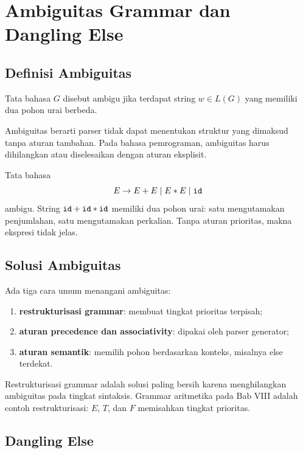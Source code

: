 \section{Ambiguitas Grammar dan Dangling Else}
\label{sec:ch09-ambiguitas}

\subsection{Definisi Ambiguitas}

\begin{definisi}
Tata bahasa \(G\) disebut ambigu jika terdapat string
\(w \in L(G)\) yang memiliki dua pohon urai berbeda.
\end{definisi}

Ambiguitas berarti parser tidak dapat menentukan struktur yang
dimaksud tanpa aturan tambahan. Pada bahasa pemrograman, ambiguitas
harus dihilangkan atau diselesaikan dengan aturan eksplisit.

\begin{contoh}
Tata bahasa
\[
E \to E + E \mid E * E \mid \texttt{id}
\]
ambigu. String \(\texttt{id} + \texttt{id} * \texttt{id}\) memiliki dua
pohon urai: satu mengutamakan penjumlahan, satu mengutamakan
perkalian. Tanpa aturan prioritas, makna ekspresi tidak jelas.
\end{contoh}

\subsection{Solusi Ambiguitas}

Ada tiga cara umum menangani ambiguitas:
\begin{enumerate}[label=\arabic*.,leftmargin=*]
  \item \textbf{restrukturisasi grammar}: membuat tingkat prioritas
        terpisah;
  \item \textbf{aturan precedence dan associativity}: dipakai oleh
        parser generator;
  \item \textbf{aturan semantik}: memilih pohon berdasarkan konteks,
        misalnya else terdekat.
\end{enumerate}

Restrukturisasi grammar adalah solusi paling bersih karena
menghilangkan ambiguitas pada tingkat sintaksis. Grammar aritmetika
pada Bab VIII adalah contoh restrukturisasi: \(E\), \(T\), dan
\(F\) memisahkan tingkat prioritas.

\subsection{Dangling Else}

